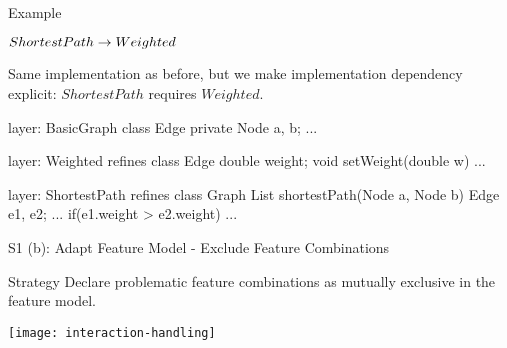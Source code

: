 \begin{frame}[fragile]{Example}
	\begin{mycolumns}[widths={50,50},animation=none]
		\begin{exampletight}{}
			\centering

			$ShortestPath \rightarrow Weighted$  
		\end{exampletight}
		\vspace{3mm}
		\begin{note}{}
			Same implementation as before, but we make implementation dependency explicit: $ShortestPath$ requires $Weighted$.
		\end{note}
	\mynextcolumn
{\small
\begin{codetight}{layer: BasicGraph}
class Edge {
	private Node a, b;
	...
}
\end{codetight}	
\begin{codetight}{layer: Weighted}
refines class Edge {
	double weight;
	void setWeight(double w){ ... }
}
\end{codetight}	
\begin{codetight}{layer: ShortestPath}
refines class Graph {
	List shortestPath(Node a, Node b){
		Edge e1, e2;
		...
		if(e1.weight > e2.weight) 
		... 
	}
}
\end{codetight}	
}
	\end{mycolumns}
\end{frame}

\begin{frame}{S1 (b): Adapt Feature Model - Exclude Feature Combinations}
	\begin{definition}{Strategy}
		Declare problematic feature combinations as mutually exclusive in the feature model.
	\end{definition}
	\begin{notetight}{}
		\centering\texttt{[image: interaction-handling]}
	\end{notetight}
\end{frame}

